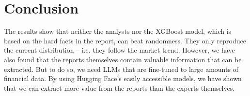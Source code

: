 \documentclass[conference]{IEEEtran}
\begin{document}
\section{Conclusion}
The results show that neither the analysts nor the XGBoost model, which is based on the hard facts in the report, can beat randomness. They only reproduce the current distribution -- i.e. they follow the market trend. However, we have also found that the reports themselves contain valuable information that can be extracted. But to do so, we need LLMs that are fine-tuned to large amounts of financial data. By using Hugging Face's easily accessible models, we have shown that we can extract more value from the reports than the experts themselves.




\end{document}
